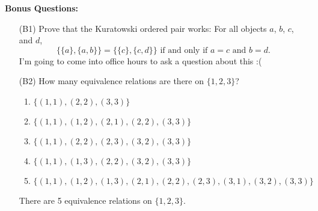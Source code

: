 \documentclass{article}
\begin{document}
    \newpage
    \textbf{Bonus Questions:}
    
    \begin{itemize}

        \item [(B1)] Prove that the Kuratowski ordered pair works: For all objects $a$, $b$, $c$, and $d$,
    	\[
    		\{ \{ a \}, \{ a, b \} \} = \{ \{ c \}, \{ c, d \} \} \text{ if and only if } a = c \text{ and } b = d.
    	\]
        I'm going to come into office hours to ask a question about this :(

        \item [(B2)] How many equivalence relations are there on $\{ 1, 2, 3 \}$?
            \begin{enumerate}
                \item $\{ (1, 1), (2, 2), (3, 3) \}$
                \item $\{ (1, 1), (1, 2), (2, 1), (2, 2), (3, 3) \}$
                \item $\{ (1, 1), (2, 2), (2, 3), (3, 2), (3, 3) \}$
                \item $\{ (1, 1), (1, 3), (2, 2), (3, 2), (3, 3) \}$
                \item $\{ (1, 1), (1, 2), (1, 3), (2, 1), (2, 2), (2, 3), (3, 1), (3, 2), (3, 3) \}$
            \end{enumerate}
            There are 5 equivalence relations on $\{ 1, 2, 3 \}$.
    \end{itemize}
\end{document}

